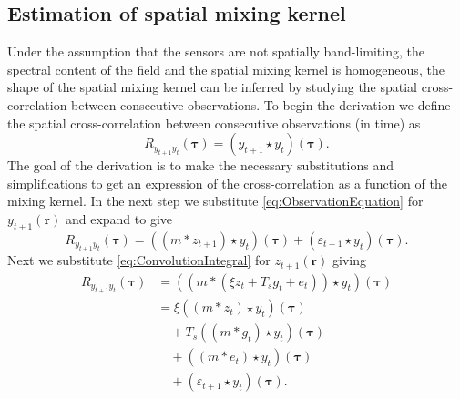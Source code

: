 \documentclass[10pt,twocolumn,twoside]{IEEEtran}
\begin{document}
\subsection{Estimation of spatial mixing kernel} 
Under the assumption that the sensors are not spatially band-limiting, the spectral content of the field and the spatial mixing kernel is homogeneous, the shape of the spatial mixing kernel can be inferred by studying the spatial cross-correlation between consecutive observations.  To begin the derivation we define the spatial cross-correlation between consecutive observations (in time) as  
\begin{equation}
	R_{y_{t+1}y_t}(\boldsymbol{\tau}) = \left(y_{t+1}\star y_t\right)\left(\boldsymbol{\tau}\right).
\end{equation}
 The goal of the derivation is to make the necessary substitutions and simplifications to get an expression of the cross-correlation as a function of the mixing kernel. In the next step we substitute \eqref{eq:ObservationEquation} for $y_{t+1}(\mathbf{r})$ and expand to give
\begin{equation}
	R_{y_{t+1}y_t}\left(\boldsymbol{\tau}\right) = \left(\left(m \ast z_{t+1}\right)\star y_t\right)\left(\boldsymbol{\tau}\right) + \left(\varepsilon_{t+1} \star y_t\right)\left(\boldsymbol{\tau}\right).
\end{equation}
Next we substitute \eqref{eq:ConvolutionIntegral} for $z_{t+1}(\mathbf{r})$ giving 
\begin{align}
	R_{y_{t+1}y_t}(\boldsymbol{\tau}) &= (\left(m \ast \left(\xi z_t +  T_s g_t + e_t\right)\right) \star y_t)(\boldsymbol{\tau})\\
	&= \xi\left(\left(m \ast z_t\right) \star y_t \right)(\boldsymbol{\tau}) \nonumber\\
	&\quad+ T_s \left(\left(m\ast g_t\right)\star y_t \right)(\boldsymbol{\tau}) \nonumber\\
	&\quad+ \left(\left(m\ast e_t\right)\star y_t \right)(\boldsymbol{\tau}) \nonumber\\
	&\quad+ (\varepsilon_{t+1} \star y_t)(\boldsymbol{\tau}).
\end{align}
\end{document}
